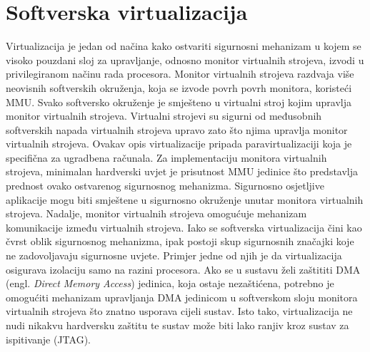 \documentclass[times, utf8, diplomski, numeric]{fer}
\begin{document}
\section{Softverska virtualizacija}
Virtualizacija je jedan od načina kako ostvariti sigurnosni mehanizam u kojem se visoko pouzdani sloj za upravljanje,
odnosno monitor virtualnih strojeva, izvodi u privilegiranom načinu rada procesora. Monitor virtualnih strojeva razdvaja
više neovisnih softverskih okruženja, koja se izvode povrh povrh monitora, koristeći MMU. Svako softversko okruženje je
smješteno u virtualni stroj kojim upravlja monitor virtualnih strojeva. Virtualni strojevi su sigurni od međusobnih softverskih
napada virtualnih strojeva upravo zato što njima upravlja monitor virtualnih strojeva. Ovakav opis virtualizacije pripada
paravirtualizaciji koja je specifična za ugradbena računala. Za implementaciju monitora virtualnih strojeva, minimalan
hardverski uvjet je prisutnost MMU jedinice što predstavlja prednost ovako ostvarenog sigurnosnog mehanizma. Sigurnosno
osjetljive aplikacije mogu biti smještene u sigurnosno okruženje unutar monitora virtualnih strojeva. Nadalje, monitor
virtualnih strojeva omogućuje mehanizam komunikacije između virtualnih strojeva. Iako se softverska virtualizacija čini kao
čvrst oblik sigurnosnog mehanizma, ipak postoji skup sigurnosnih značajki koje ne zadovoljavaju sigurnosne uvjete. Primjer
jedne od njih je da virtualizacija osigurava izolaciju samo na razini procesora. Ako se u sustavu želi zaštititi DMA (engl.
\textit{Direct Memory Access}) jedinica, koja ostaje nezaštićena, potrebno je omogućiti mehanizam upravljanja DMA jedinicom
u softverskom sloju monitora virtualnih strojeva što znatno usporava cijeli sustav. Isto tako, virtualizacija ne nudi nikakvu
hardversku zaštitu te sustav može biti lako ranjiv kroz sustav za ispitivanje (JTAG).
\end{document}
